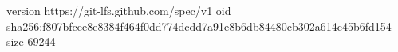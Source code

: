 version https://git-lfs.github.com/spec/v1
oid sha256:f807bfcee8e8384f464f0dd774dcdd7a91e8b6db84480cb302a614c45b6fd154
size 69244
